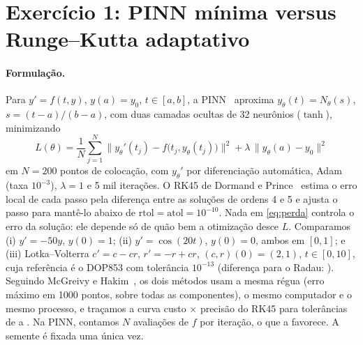 
\section{Exercício 1: PINN mínima versus Runge--Kutta adaptativo}

\paragraph{Formulação.} Para $y' = f(t,y)$, $y(a) = y_0$, $t \in [a,b]$, a PINN~\cite{raissi2019} aproxima
$y_\theta(t) = N_\theta(s)$, $s = (t-a)/(b-a)$, com duas camadas ocultas de 32 neurônios ($\tanh$), minimizando
\begin{equation}
  L(\theta) = \frac{1}{N}\sum_{j=1}^{N} \big\| y_\theta'(t_j) - f\big(t_j, y_\theta(t_j)\big) \big\|^2
            + \lambda\, \big\| y_\theta(a) - y_0 \big\|^2
  \label{eq:perda}
\end{equation}
em $N = 200$ pontos de colocação, com $y_\theta'$ por diferenciação automática, Adam (taxa $10^{-3}$), $\lambda = 1$ e
5 mil iterações. O RK45 de Dormand e Prince~\cite{dormand1980} estima o erro local de cada passo pela diferença entre as
soluções de ordens 4 e 5 e ajusta o passo para mantê-lo abaixo de $\mathrm{rtol} = \mathrm{atol} = 10^{-10}$. Nada em
\eqref{eq:perda} controla o erro da solução: ele depende só de quão bem a otimização desce $L$. Comparamos
(i) $y' = -50y$, $y(0) = 1$; (ii) $y' = \cos(20t)$, $y(0) = 0$, ambos em $[0,1]$; e (iii) Lotka--Volterra
$c' = c - cr$, $r' = -r + cr$, $(c,r)(0) = (2,1)$, $t \in [0,10]$, cuja referência é o DOP853 com tolerância
$10^{-13}$ (diferença para o Radau: \DifRefRadau). Seguindo McGreivy e Hakim~\cite{mcgreivy2024}, os dois métodos usam
a mesma régua (erro máximo em 1000 pontos, sobre todas as componentes), o mesmo computador e o mesmo processo, e
traçamos a curva custo $\times$ precisão do RK45 para tolerâncias de \ToleranciaMaxima{} a \ToleranciaMinima. Na PINN,
contamos $N$ avaliações de $f$ por iteração, o que a favorece. A semente é fixada uma única vez.

\begin{table}[ht]
  \centering
  \caption{Erro máximo, tempo e avaliações de $f$.}
  \label{tab:ex1}
  \resizebox{\linewidth}{!}{}
\end{table}

